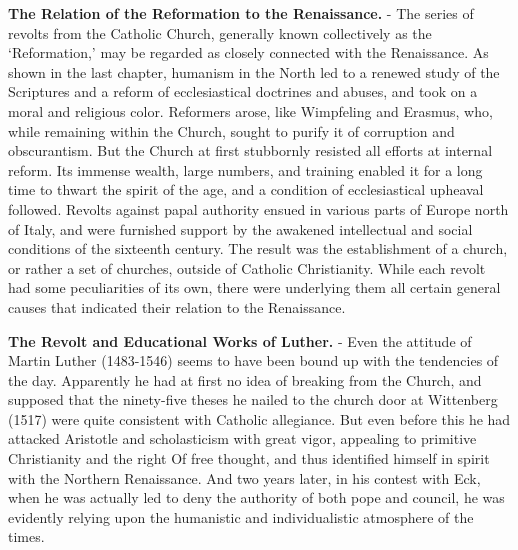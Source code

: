 \documentclass[]{book}
\begin{document}
\textbf{The Relation of the Reformation to the Renaissance.} - The series of revolts from the Catholic Church, generally known collectively as the `Reformation,' may be regarded as closely connected with the Renaissance. As shown in the last chapter, humanism in the North led to a renewed study of the Scriptures and a reform of ecclesiastical doctrines and abuses, and took on a moral and religious color. Reformers arose, like Wimpfeling and Erasmus, who, while remaining within the Church, sought to purify it of corruption and obscurantism. But the Church at first stubbornly resisted all efforts at internal reform. Its immense wealth, large numbers, and training enabled it for a long time to thwart the spirit of the age, and a condition of ecclesiastical upheaval followed. Revolts against papal authority ensued in various parts of Europe north of Italy, and were furnished support by the awakened intellectual and social conditions of the sixteenth century. The result was the establishment of a church, or rather a set of churches, outside of Catholic Christianity. While each revolt had some peculiarities of its own, there were underlying them all certain general causes that indicated their relation to the Renaissance.

\textbf{The Revolt and Educational Works of Luther.} - Even the attitude of Martin Luther (1483-1546) seems to have been bound up with the tendencies of the day. Apparently he had at first no idea of breaking from the Church, and supposed that the ninety-five theses he nailed to the church door at Wittenberg (1517) were quite consistent with Catholic allegiance. But even before this he had attacked Aristotle and scholasticism with great vigor, appealing to primitive Christianity and the right Of free thought, and thus identified himself in spirit with the Northern Renaissance. And two years later, in his contest with Eck, when he was actually led to deny the authority of both pope and council, he was evidently relying upon the humanistic and individualistic atmosphere of the times.
\end{document}
